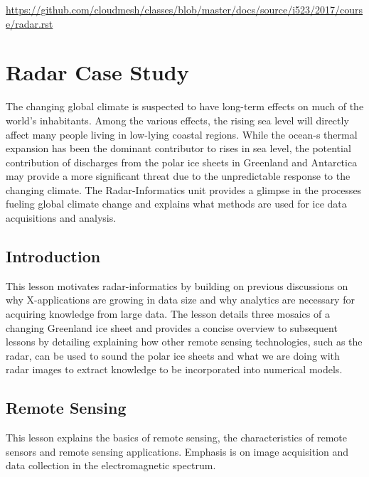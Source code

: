 \begin{fileremark}\url{https://github.com/cloudmesh/classes/blob/master/docs/source/i523/2017/course/radar.rst}\end{fileremark}
\section{Radar Case Study}\label{radar-case-study}

The changing global climate is suspected to have long-term effects on
much of the world's inhabitants. Among the various effects, the rising
sea level will directly affect many people living in low-lying coastal
regions. While the ocean-s thermal expansion has been the dominant
contributor to rises in sea level, the potential contribution of
discharges from the polar ice sheets in Greenland and Antarctica may
provide a more significant threat due to the unpredictable response to
the changing climate. The Radar-Informatics unit provides a glimpse in
the processes fueling global climate change and explains what methods
are used for ice data acquisitions and analysis.


\subsection{Introduction}\label{introduction}

This lesson motivates radar-informatics by building on previous
discussions on why X-applications are growing in data size and why
analytics are necessary for acquiring knowledge from large data. The
lesson details three mosaics of a changing Greenland ice sheet and
provides a concise overview to subsequent lessons by detailing
explaining how other remote sensing technologies, such as the radar, can
be used to sound the polar ice sheets and what we are doing with radar
images to extract knowledge to be incorporated into numerical models.


\subsection{Remote Sensing}\label{remote-sensing}

This lesson explains the basics of remote sensing, the characteristics
of remote sensors and remote sensing applications. Emphasis is on image
acquisition and data collection in the electromagnetic spectrum.

